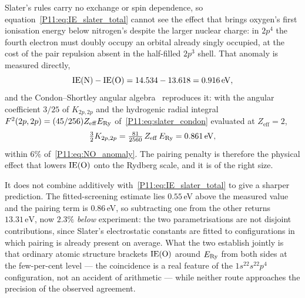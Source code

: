 \begin{remark}
\label{P11:rem:pairing_penalty}
Slater's rules carry no exchange or spin dependence, so
equation~\eqref{P11:eq:IE_slater_total} cannot see the effect that
brings oxygen's first ionisation energy below nitrogen's despite the
larger nuclear charge: in $2p^4$ the fourth electron must doubly
occupy an orbital already singly occupied, at the cost of the pair
repulsion absent in the half-filled $2p^3$ shell.  That anomaly is
measured directly,
\begin{equation}
  \mathrm{IE}(\mathrm{N}) - \mathrm{IE}(\mathrm{O})
  = 14.534 - 13.618 = 0.916\,\mathrm{eV},
  \label{P11:eq:NO_anomaly}
\end{equation}
and the Condon--Shortley angular algebra~\cite{Condon1935} reproduces
it: with the angular coefficient $3/25$ of $K_{2p,2p}$ and the hydrogenic
radial integral $F^2(2p,2p) = (45/256)Z_\mathrm{eff}E_{\mathrm{Ry}}$
of~\eqref{P11:eq:slater_condon} evaluated at $Z_\mathrm{eff}=2$,
\begin{equation}
  \tfrac{3}{2}K_{2p,2p} = \tfrac{81}{2560}\,Z_\mathrm{eff}\,E_{\mathrm{Ry}}
  = 0.861\,\mathrm{eV},
  \label{P11:eq:pairing_K}
\end{equation}
within $6\%$ of~\eqref{P11:eq:NO_anomaly}.  The pairing penalty is
therefore the physical effect that lowers $\mathrm{IE}(\mathrm{O})$ onto the
Rydberg scale, and it is of the right size.

It does not combine additively with~\eqref{P11:eq:IE_slater_total} to
give a sharper prediction.  The fitted-screening estimate lies $0.55\,$eV above the measured
value and the pairing term is $0.86\,$eV, so subtracting one from the
other returns $13.31\,\mathrm{eV}$, now $2.3\%$ \emph{below}
experiment: the two parametrisations are not
disjoint contributions, since Slater's electrostatic constants are
fitted to configurations in which pairing is already present on
average.  What the two establish jointly is that ordinary atomic
structure brackets $\mathrm{IE}(\mathrm{O})$ around $E_{\mathrm{Ry}}$ from both sides at
the few-per-cent level --- the coincidence is a real feature of the
$1s^22s^22p^4$ configuration, not an accident of arithmetic --- while
neither route approaches the precision of the observed agreement.
\end{remark}

